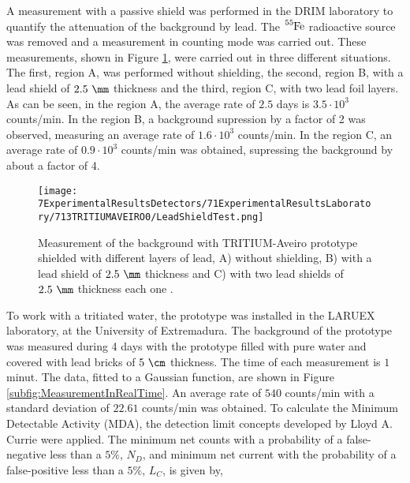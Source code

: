 A measurement with a passive shield was performed in the DRIM laboratory to quantify the attenuation of the background by lead. The $\ce{^{55}Fe}$ radioactive source was removed and a measurement in counting mode was carried out. These measurements, shown in Figure \ref{fig:LeadShieldTest}, were carried out in three different situations. The first, region A, was performed without shielding, the second, region B, with a lead shield of $2.5~\mm$ thickness and the third, region C, with two lead foil layers. As can be seen, in the region A, the average rate of $2.5$ days is $3.5 \cdot{} 10^3$ counts/min. In the region B, a background supression by a factor of 2 was observed, measuring an average rate of $1.6 \cdot{} 10^3$ counts/min. In the region C, an average rate of $0.9 \cdot{} 10^3$ counts/min was obtained, supressing the background by about a factor of 4.

\begin{figure}[h]
\centering
\texttt{[image: 7ExperimentalResultsDetectors/71ExperimentalResultsLaboratory/713TRITIUMAVEIRO0/LeadShieldTest.png]}
\caption{Measurement of the background with TRITIUM-Aveiro prototype shielded with different layers of lead, A) without shielding, B) with a lead shield of $2.5~\mm$ thickness and C) with two lead shields of $2.5~\mm$ thickness each one \cite{ExperimentalPaperCarlos}.\label{fig:LeadShieldTest}}
\end{figure}


To work with a tritiated water, the prototype was installed in the LARUEX laboratory, at the University of Extremadura. The background of the prototype was measured during 4 days with the prototype filled with pure water and covered with lead bricks of $5~\cm$ thickness. The time of each measurement is $1$ minut. The data, fitted to a Gaussian function, are shown in Figure \ref{subfig:MeasurementInRealTime}. An average rate of $540$ counts/min with a standard deviation of $22.61$ counts/min was obtained. To calculate the Minimum Detectable Activity (MDA), the detection limit concepts developed by Lloyd A. Currie \cite{CurieLimit} were applied.  The minimum net counts with a probability of a false-negative less than a $5\%$, $N_D$, and minimum net current with the probability of a false-positive less than a $5\%$, $L_C$, is given by,

